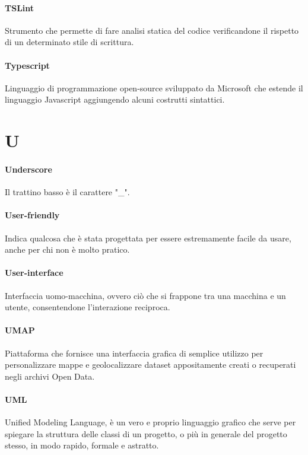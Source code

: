 \documentclass[]{article}
\begin{document}
	\paragraph*{TSLint}
	Strumento che permette di fare analisi statica del codice verificandone il rispetto di un determinato stile di scrittura.

	\paragraph*{Typescript}
	Linguaggio di programmazione open-source sviluppato da Microsoft che estende il linguaggio Javascript aggiungendo alcuni costrutti sintattici.

	\newpage

	\section*{U}

	\paragraph*{Underscore}
	Il trattino basso è il carattere "\_".

	\paragraph*{User-friendly}
	Indica qualcosa che è stata progettata per essere estremamente facile da usare, anche per chi non è molto pratico.

	\paragraph*{User-interface}
	Interfaccia uomo-macchina, ovvero ciò che si frappone tra una macchina e un utente, consentendone l'interazione reciproca.

	\paragraph*{UMAP}
	Piattaforma che fornisce una interfaccia grafica di semplice utilizzo per personalizzare mappe e geolocalizzare dataset appositamente creati o recuperati negli archivi Open Data.

	\paragraph*{UML}
	Unified Modeling Language, è un vero e proprio linguaggio grafico che serve per spiegare la struttura delle classi di un progetto, o più in generale del progetto stesso, in modo rapido, formale e astratto.
\end{document}
